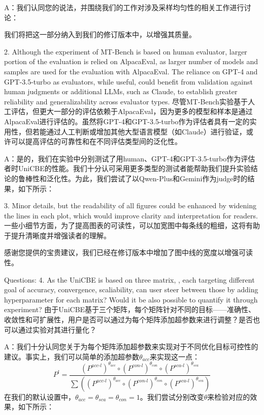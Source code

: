A：我们认同您的说法，并围绕我们的工作对涉及采样均匀性的相关工作进行讨论：

我们将把这一部分纳入到我们的修订版本中，以增强其质量。


2. Although the experiment of MT-Bench is based on human evaluator, larger portion of the evaluation is relied on AlpacaEval, as larger number of models and samples are used for the evaluation with AlpacaEval. The reliance on GPT-4 and GPT-3.5-turbo as evaluators, while useful, could benefit from validation against human judgments or additional LLMs, such as Claude, to establish greater reliability and generalizability across evaluator types.
尽管MT-Bench实验基于人工评估，但更大一部分的评估依赖于AlpacaEval，因为更多的模型和样本是通过AlpacaEval进行评估的。虽然将GPT-4和GPT-3.5-turbo作为评估者具有一定的实用性，但若能通过人工判断或增加其他大型语言模型（如Claude）进行验证，或许可以提高评估的可靠性和在不同评估类型间的泛化性。

A：是的，我们在实验中分别测试了用human、GPT-4和GPT-3.5-turbo作为评估者时UniCBE的性能。我们十分认可采用更多类型的测试者能帮助我们提升实验结论的鲁棒性和泛化性。为此，我们尝试了以Qwen-Plus和Gemini作为judge时的结果，如下所示：

3. Minor details, but the readability of all figures could be enhanced by widening the lines in each plot, which would improve clarity and interpretation for readers.
一些小细节方面，为了提高图表的可读性，可以加宽图中每条线的粗细，这将有助于提升清晰度并增强读者的理解。

感谢您提供的宝贵建议，我们已经在修订版本中增加了图中线的宽度以增强可读性。



Questions:
4. As the UniCBE is based on three matrix, 
, each targeting different goal of accuracy, convergence, scaliability, can user steer between those by adding hyperparameter for each matrix? Would it be also possible to quantify it through experiment?
由于UniCBE基于三个矩阵，每个矩阵针对不同的目标——准确性、收敛性和可扩展性，用户是否可以通过为每个矩阵添加超参数来进行调整？是否也可以通过实验对其进行量化？

A：我们十分认同您关于为每个矩阵添加超参数来实现对于不同优化目标可控性的建议。事实上，我们可以简单的添加超参数$\theta_{acc}$来实现这一点：
$$P^{l} = \frac{(P^{acc\text{-}l})^{\theta_{acc}} \circ (P^{con\text{-}l})^{\theta_{con}}  \circ (P^{sca\text{-}l})^{\theta_{sca}} }{\sum ((P^{acc\text{-}l})^{\theta_{acc}} \circ (P^{con\text{-}l})^{\theta_{con}}  \circ (P^{sca\text{-}l})^{\theta_{sca}})}$$
在我们的默认设置中，$\theta_{acc}=\theta_{sca}=\theta_{con}=1$。我们尝试分别改变$\theta$来检验对应的效果，如下所示：


